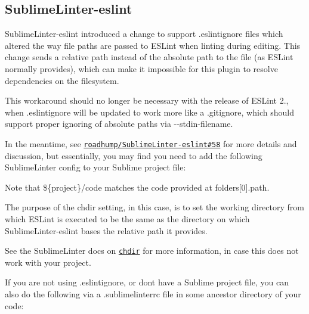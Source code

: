\subsection*{Sublime\+Linter-\/eslint}

Sublime\+Linter-\/eslint introduced a change to support {\ttfamily .eslintignore} files which altered the way file paths are passed to E\+S\+Lint when linting during editing. This change sends a relative path instead of the absolute path to the file (as E\+S\+Lint normally provides), which can make it impossible for this plugin to resolve dependencies on the filesystem.

This workaround should no longer be necessary with the release of E\+S\+Lint 2., when {\ttfamily .eslintignore} will be updated to work more like a {\ttfamily .gitignore}, which should support proper ignoring of absolute paths via {\ttfamily -\/-\/stdin-\/filename}.

In the meantime, see \href{https://github.com/roadhump/SublimeLinter-eslint/issues/58}{\tt roadhump/\+Sublime\+Linter-\/eslint\#58} for more details and discussion, but essentially, you may find you need to add the following {\ttfamily Sublime\+Linter} config to your Sublime project file\+:




Note that {\ttfamily \$\{project\}/code} matches the {\ttfamily code} provided at {\ttfamily folders\mbox{[}0\mbox{]}.path}.

The purpose of the {\ttfamily chdir} setting, in this case, is to set the working directory from which E\+S\+Lint is executed to be the same as the directory on which Sublime\+Linter-\/eslint bases the relative path it provides.

See the Sublime\+Linter docs on \href{http://www.sublimelinter.com/en/latest/linter_settings.html#chdir}{\tt {\ttfamily chdir}} for more information, in case this does not work with your project.

If you are not using {\ttfamily .eslintignore}, or don\textquotesingle{}t have a Sublime project file, you can also do the following via a {\ttfamily .sublimelinterrc} file in some ancestor directory of your code\+:


